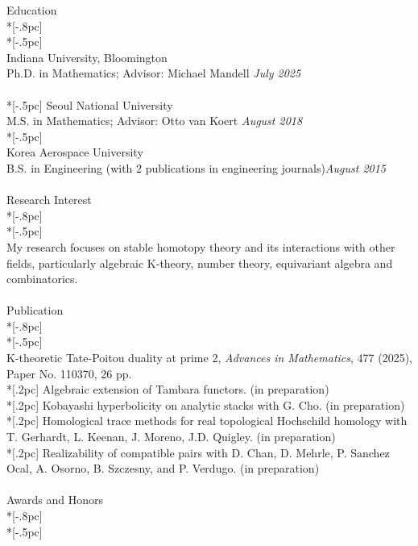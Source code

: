 \documentclass{article}
\begin{document}
{\Large  Education} \\*[-.8pc]
\underline{\hspace{6.5in}} \\*[-.5pc]
\\
{ Indiana University, Bloomington}\\ 
{Ph.D. in Mathematics; Advisor: Michael Mandell} \hfill {\it  July 2025} \\
\\*[-.5pc]
{ Seoul National University} \\ 
{M.S. in Mathematics; Advisor: Otto van Koert} \hfill{\it August 2018 } \\*[-.5pc]
\\
{ Korea Aerospace University} \\
{B.S. in Engineering (with 2 publications in engineering journals)}\hfill{\it August 2015}\\
\\
{\Large  Research Interest} \\*[-.8pc]
\underline{\hspace{6.5in}} \\*[-.5pc]
\\
My research focuses on stable homotopy theory and its interactions with other fields, particularly algebraic K-theory, number theory, equivariant algebra and combinatorics.
\\
\\
{\Large  Publication} \\*[-.8pc]
\underline{\hspace{6.5in}} \\*[-.5pc]
\\
{K-theoretic Tate-Poitou duality at prime 2}, {\it Advances in Mathematics}, 477 (2025), Paper No. 110370, 26 pp. \\*[.2pc]
{Algebraic extension of Tambara functors}. (in preparation)\\*[.2pc]
{Kobayashi hyperbolicity on analytic stacks} with G. Cho. (in preparation)\\*[.2pc]
{Homological trace methods for real topological Hochschild homology} with T. Gerhardt, L. Keenan, J. Moreno, J.D. Quigley. (in preparation)\\*[.2pc]
{Realizability of compatible pairs} with D. Chan, D. Mehrle, P. Sanchez Ocal, A. Osorno, B. Szczesny, and P. Verdugo. (in preparation)\\
\\ 
{\Large  Awards and Honors} \\*[-.8pc]
\underline{\hspace{6.5in}} \\*[-.5pc]
\end{document}

